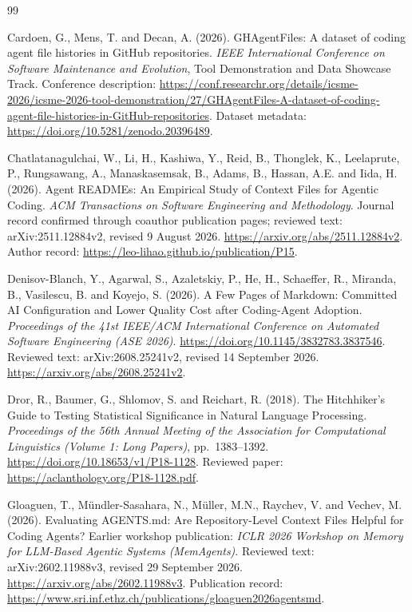 \begingroup
\small
\raggedright
{}
\begin{thebibliography}{99}

Cardoen, G., Mens, T. and Decan, A. (2026).
GHAgentFiles: A dataset of coding agent file histories in GitHub repositories.
\textit{IEEE International Conference on Software Maintenance and Evolution},
Tool Demonstration and Data Showcase Track.
Conference description: \url{https://conf.researchr.org/details/icsme-2026/icsme-2026-tool-demonstration/27/GHAgentFiles-A-dataset-of-coding-agent-file-histories-in-GitHub-repositories}.
Dataset metadata: \url{https://doi.org/10.5281/zenodo.20396489}.

Chatlatanagulchai, W., Li, H., Kashiwa, Y., Reid, B., Thonglek, K.,
Leelaprute, P., Rungsawang, A., Manaskasemsak, B., Adams, B., Hassan, A.E.
and Iida, H. (2026).
Agent READMEs: An Empirical Study of Context Files for Agentic Coding.
\textit{ACM Transactions on Software Engineering and Methodology}.
Journal record confirmed through coauthor publication pages; reviewed text:
arXiv:2511.12884v2, revised 9 August 2026.
\url{https://arxiv.org/abs/2511.12884v2}.
Author record: \url{https://leo-lihao.github.io/publication/P15}.

Denisov-Blanch, Y., Agarwal, S., Azaletskiy, P., He, H., Schaeffer, R.,
Miranda, B., Vasilescu, B. and Koyejo, S. (2026).
A Few Pages of Markdown: Committed AI Configuration and Lower Quality Cost
after Coding-Agent Adoption.
\textit{Proceedings of the 41st IEEE/ACM International Conference on Automated
Software Engineering (ASE 2026)}.
\url{https://doi.org/10.1145/3832783.3837546}.
Reviewed text: arXiv:2608.25241v2, revised 14 September 2026.
\url{https://arxiv.org/abs/2608.25241v2}.

Dror, R., Baumer, G., Shlomov, S. and Reichart, R. (2018).
The Hitchhiker's Guide to Testing Statistical Significance in Natural
Language Processing.
\textit{Proceedings of the 56th Annual Meeting of the Association for
Computational Linguistics (Volume 1: Long Papers)}, pp.~1383--1392.
\url{https://doi.org/10.18653/v1/P18-1128}.
Reviewed paper: \url{https://aclanthology.org/P18-1128.pdf}.

Gloaguen, T., M\"undler-Sasahara, N., M\"uller, M.N., Raychev, V. and Vechev, M.
(2026). Evaluating AGENTS.md: Are Repository-Level Context Files Helpful for
Coding Agents?
Earlier workshop publication: \textit{ICLR 2026 Workshop on Memory for
LLM-Based Agentic Systems (MemAgents)}.
Reviewed text: arXiv:2602.11988v3, revised 29 September 2026.
\url{https://arxiv.org/abs/2602.11988v3}.
Publication record: \url{https://www.sri.inf.ethz.ch/publications/gloaguen2026agentsmd}.


\end{thebibliography}
